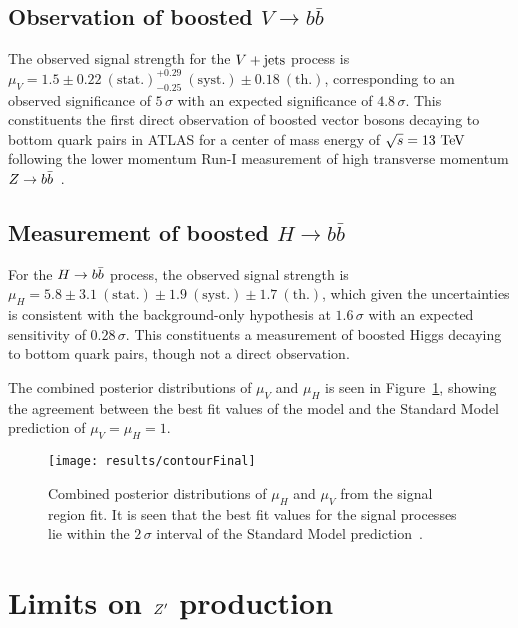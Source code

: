 \subsection{Observation of boosted $V\to b\bar{b}$}

The observed signal strength for the $V + \text{jets}$ process is\\ $\mu_{V} = 1.5 \pm 0.22~\mathrm{(stat.)}^{+0.29}_{-0.25}~\mathrm{(syst.)} \pm 0.18~\mathrm{(th.)}$, corresponding to an observed significance of $5\,\sigma$ with an expected significance of $4.8\,\sigma$.
This constituents the first direct observation of boosted vector bosons decaying to bottom quark pairs in ATLAS for a center of mass energy of $\sqrt{s}=13~\mathrm{TeV}$ following the lower momentum Run-I measurement of high transverse momentum $Z \to b\bar{b}$~\cite{STDM-2013-04}.

\subsection{Measurement of boosted $H\to b\bar{b}$}
For the $H \to b\bar{b}$ process, the observed signal strength is\\ $\mu_{H} = 5.8 \pm 3.1~\mathrm{(stat.)} \pm 1.9~\mathrm{(syst.)} \pm 1.7~\mathrm{(th.)}$, which given the uncertainties is consistent with the background-only hypothesis at $1.6\,\sigma$ with an expected sensitivity of $0.28\,\sigma$.
This constituents a measurement of boosted Higgs decaying to bottom quark pairs, though not a direct observation.

The combined posterior distributions of $\mu_{V}$ and $\mu_{H}$ is seen in Figure~\ref{fig:signal_strength_contour}, showing the agreement between the best fit values of the model and the Standard Model prediction of $\mu_{V} = \mu_{H} = 1$.

\begin{figure}[htbp]
 \centering
 \texttt{[image: results/contourFinal]}
 \caption{Combined posterior distributions of $\mu_{H}$ and $\mu_{V}$ from the signal region fit.
  It is seen that the best fit values for the signal processes lie within the $2\,\sigma$ interval of the Standard Model prediction~\cite{ATLAS-CONF-2018-052}.}
 \label{fig:signal_strength_contour}
\end{figure}
\clearpage

\section{Limits on $Z'$ production}

